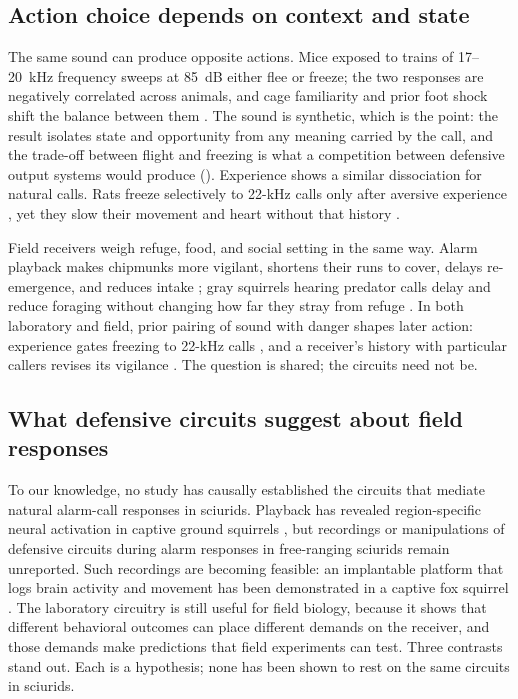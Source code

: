 \subsection{Action choice depends on context and state}
\label{sec:action-context}

The same sound can produce opposite actions. Mice exposed to trains of 17--20~kHz frequency sweeps at 85~dB either flee or freeze; the two responses are negatively correlated across animals, and cage familiarity and prior foot shock shift the balance between them \citep{MongeauEtAl2003}. The sound is synthetic, which is the point: the result isolates state and opportunity from any meaning carried by the call, and the trade-off between flight and freezing is what a competition between defensive output systems would produce (). Experience shows a similar dissociation for natural calls. Rats freeze selectively to 22-kHz calls only after aversive experience \citep{KimEtAl2010,EndresEtAl2007}, yet they slow their movement and heart without that history \citep{OlszynskiEtAl2020}.

Field receivers weigh refuge, food, and social setting in the same way. Alarm playback makes chipmunks more vigilant, shortens their runs to cover, delays re-emergence, and reduces intake \citep{BaackSwitzer2000}; gray squirrels hearing predator calls delay and reduce foraging without changing how far they stray from refuge \citep{JayneEtAl2015}.
In both laboratory and field, prior pairing of sound with danger shapes later action: experience gates freezing to 22-kHz calls \citep{KimEtAl2010}, and a receiver's history with particular callers revises its vigilance \citep{HareAtkins2001,BlumsteinEtAl2004}. The question is shared; the circuits need not be.

\subsection{What defensive circuits suggest about field responses}
\label{sec:action-circuits}

To our knowledge, no study has causally established the circuits that mediate natural alarm-call responses in sciurids. Playback has revealed region-specific neural activation in captive ground squirrels \citep{FreemanEtAl2020}, but recordings or manipulations of defensive circuits during alarm responses in free-ranging sciurids remain unreported. Such recordings are becoming feasible: an implantable platform that logs brain activity and movement has been demonstrated in a captive fox squirrel \citep{GaidicaDantzer2022}. The laboratory circuitry is still useful for field biology, because it shows that different behavioral outcomes can place different demands on the receiver, and those demands make predictions that field experiments can test. Three contrasts stand out. Each is a hypothesis; none has been shown to rest on the same circuits in sciurids.

